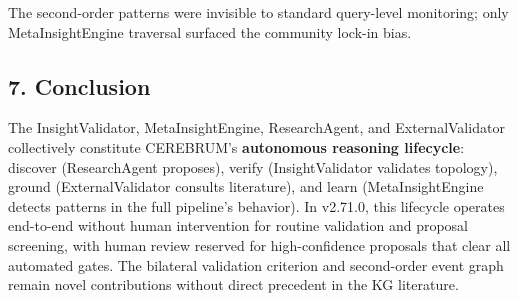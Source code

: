 The second-order patterns were invisible to standard query-level monitoring; only MetaInsightEngine traversal surfaced the community lock-in bias.

\subsection*{7. Conclusion}
The InsightValidator, MetaInsightEngine, ResearchAgent, and ExternalValidator collectively constitute CEREBRUM's \textbf{autonomous reasoning lifecycle}: discover (ResearchAgent proposes), verify (InsightValidator validates topology), ground (ExternalValidator consults literature), and learn (MetaInsightEngine detects patterns in the full pipeline's behavior). In v2.71.0, this lifecycle operates end-to-end without human intervention for routine validation and proposal screening, with human review reserved for high-confidence proposals that clear all automated gates. The bilateral validation criterion and second-order event graph remain novel contributions without direct precedent in the KG literature.